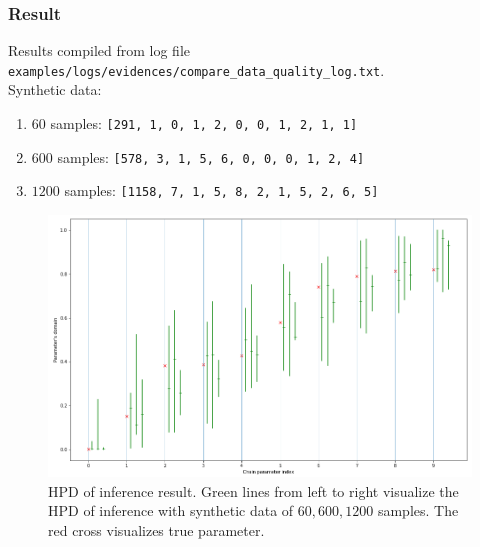 \documentclass[12pt]{article}
\theoremstyle{definition}
\begin{document}
\subsubsection{Result}
Results compiled from log file
\texttt{examples/logs/evidences/compare\_data\_quality\_log.txt}.\\
Synthetic data:
\begin{enumerate}
\item $60$ samples: \texttt{[291, 1, 0, 1, 2, 0, 0, 1, 2, 1, 1]}
\item $600$ samples: \texttt{[578, 3, 1, 5, 6, 0, 0, 0, 1, 2, 4]}
\item $1200$ samples: \texttt{[1158, 7, 1, 5, 8, 2, 1, 5, 2, 6, 5]}
\end{enumerate}
\begin{figure}[H]
  \centering
  \includegraphics[width=\textwidth,keepaspectratio]{figures/data_quality.png}
  \caption{HPD of inference result. Green lines from left to right visualize the
    HPD of inference with synthetic data of $60, 600, 1200$ samples. The red
    cross visualizes true parameter.} 
\end{figure}
\end{document}
